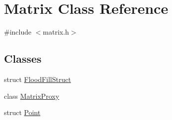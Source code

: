 \hypertarget{classMatrix}{
\section{Matrix Class Reference}
\label{classMatrix}
}


{\ttfamily \#include $<$matrix.h$>$}

\subsection*{Classes}
\begin{DoxyCompactItemize}
\item 
struct \hyperlink{structMatrix_1_1FloodFillStruct}{FloodFillStruct}
\item 
class \hyperlink{classMatrix_1_1MatrixProxy}{MatrixProxy}
\item 
struct \hyperlink{structMatrix_1_1Point}{Point}
\end{DoxyCompactItemize}
